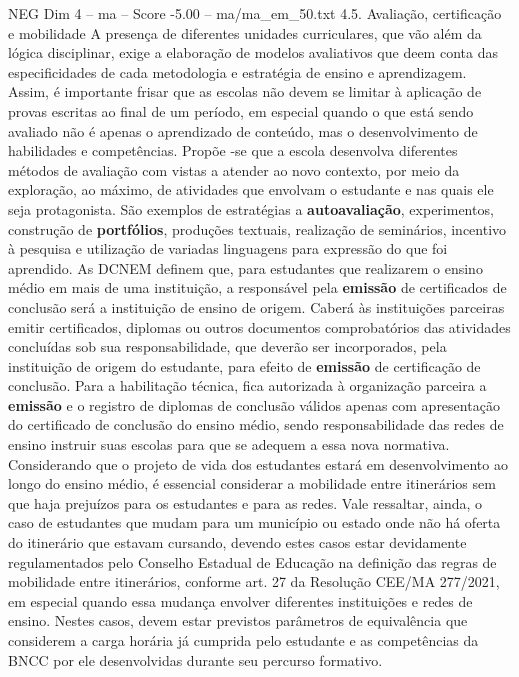 \begin{textsample}{NEG Dim 4 – ma – Score -5.00 – ma/ma\_em\_50.txt}  \label{ex:f4_neg_231}
4.5.
Avaliação, certificação e mobilidade A presença de diferentes unidades curriculares, que vão além da lógica disciplinar, exige a elaboração de modelos avaliativos que deem conta das especificidades de cada metodologia e estratégia de ensino e aprendizagem.
Assim, é importante frisar que as escolas não devem se limitar à aplicação de provas escritas ao final de um período, em especial quando o que está sendo avaliado não é apenas o aprendizado de conteúdo, mas o desenvolvimento de habilidades e competências.
Propõe -se que a escola desenvolva diferentes métodos de avaliação com vistas a atender ao novo contexto, por meio da exploração, ao máximo, de atividades que envolvam o estudante e nas quais ele seja protagonista.
São exemplos de estratégias a \textbf{autoavaliação}, experimentos, construção de \textbf{portfólios}, produções textuais, realização de seminários, incentivo à pesquisa e utilização de variadas linguagens para expressão do que foi aprendido.
As DCNEM definem que, para estudantes que realizarem o ensino médio em mais de uma instituição, a responsável pela \textbf{emissão} de certificados de conclusão será a instituição de ensino de origem.
Caberá às instituições parceiras emitir certificados, diplomas ou outros documentos comprobatórios das atividades concluídas sob sua responsabilidade, que deverão ser incorporados, pela instituição de origem do estudante, para efeito de \textbf{emissão} de certificação de conclusão.
Para a habilitação técnica, fica autorizada à organização parceira a \textbf{emissão} e o registro de diplomas de conclusão válidos apenas com apresentação do certificado de conclusão do ensino médio, sendo responsabilidade das redes de ensino instruir suas escolas para que se adequem a essa nova normativa.
Considerando que o projeto de vida dos estudantes estará em desenvolvimento ao longo do ensino médio, é essencial considerar a mobilidade entre itinerários sem que haja prejuízos para os estudantes e para as redes.
Vale ressaltar, ainda, o caso de estudantes que mudam para um município ou estado onde não há oferta do itinerário que estavam cursando, devendo estes casos estar devidamente regulamentados pelo Conselho Estadual de Educação na definição das regras de mobilidade entre itinerários, conforme art. 27 da Resolução CEE/MA 277/2021, em especial quando essa mudança envolver diferentes instituições e redes de ensino.
Nestes casos, devem estar previstos parâmetros de equivalência que considerem a carga horária já cumprida pelo estudante e as competências da BNCC por ele desenvolvidas durante seu percurso formativo.

\end{textsample}
